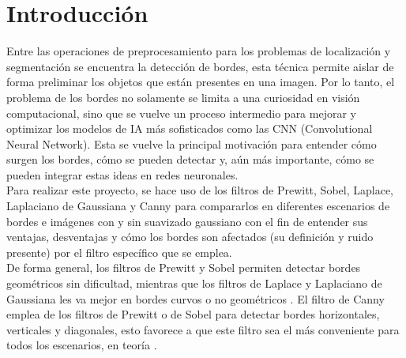 \section{Introducción}
    Entre las operaciones de preprocesamiento para los problemas 
    de localización y segmentación se encuentra la detección de 
    bordes, esta técnica permite aislar de forma preliminar los 
    objetos que están presentes en una imagen. Por lo tanto, el 
    problema de los bordes no solamente se limita a una curiosidad 
    en visión computacional, sino que se vuelve un proceso intermedio 
    para mejorar y optimizar los modelos de IA más sofisticados 
    como las CNN (Convolutional Neural Network). Esta se vuelve la 
    principal motivación para entender cómo surgen los bordes, 
    cómo se pueden detectar y, aún más importante, cómo se pueden 
    integrar estas ideas en redes neuronales.\\

    Para realizar este proyecto, se hace uso de los filtros de Prewitt, 
    Sobel, Laplace, Laplaciano de Gaussiana y Canny para compararlos 
    en diferentes escenarios de bordes e imágenes con y sin suavizado 
    gaussiano con el fin de entender sus ventajas, desventajas y 
    cómo los bordes son afectados (su definición y ruido presente) por 
    el filtro específico que se emplea. \\

    De forma general, los filtros de Prewitt y Sobel permiten detectar 
    bordes geométricos sin dificultad, mientras que los filtros de Laplace 
    y Laplaciano de Gaussiana les va mejor en bordes curvos o no geométricos \parencite{tinoco2026pdi}. 
    El filtro de Canny emplea de los filtros de Prewitt o de Sobel para 
    detectar bordes horizontales, verticales y diagonales, esto favorece a 
    que este filtro sea el más conveniente para todos los escenarios, en 
    teoría \parencite{wiki2026canny}.